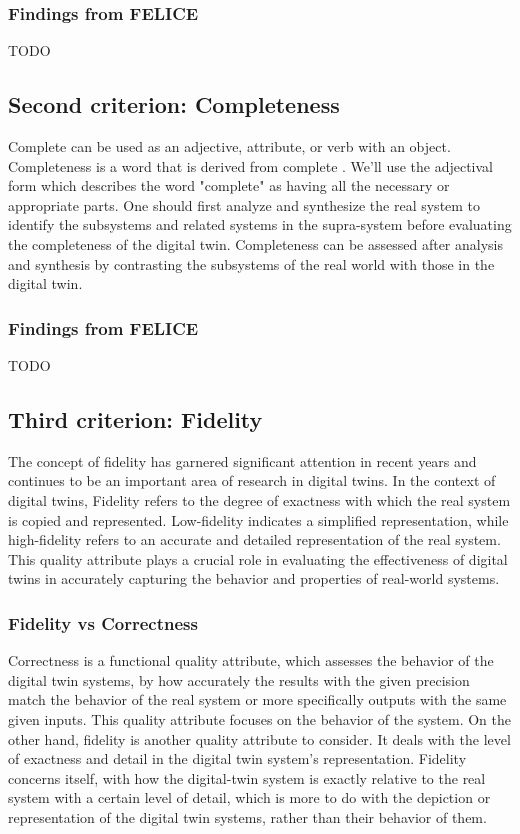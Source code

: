 \documentclass[9pt,conference]{IEEEtran}
\begin{document}
    \subsubsection{Findings from FELICE}
    TODO

    \subsection{Second criterion: Completeness}
    Complete can be used as an adjective, attribute, or verb with an object. Completeness is a word that is derived from complete \cite{OxfordDictionary}.
    We'll use the adjectival form which describes the word "complete" as having all the necessary or appropriate parts.
    One should first analyze and synthesize the real system to identify the subsystems and related systems in the supra-system before evaluating the completeness of the digital twin. 
    Completeness can be assessed after analysis and synthesis by contrasting the subsystems of the real world with those in the digital twin.

    \subsubsection{Findings from FELICE}
    TODO

    \subsection{Third criterion: Fidelity}
    The concept of fidelity has garnered significant attention in recent years and continues to be an important area of research in digital twins.
    In the context of digital twins, Fidelity refers to the degree of exactness with which the real system is copied and represented.
    Low-fidelity indicates a simplified representation, while high-fidelity refers to an accurate and detailed representation of the real system.
    This quality attribute plays a crucial role in evaluating the effectiveness of digital twins in accurately capturing the behavior and properties of real-world systems. 
    \subsubsection*{Fidelity vs Correctness}
    Correctness is a functional quality attribute, which assesses the behavior of the digital twin systems, by how accurately the results with the given precision match the behavior of the real system or more
    specifically outputs with the same given inputs. 
    This quality attribute focuses on the behavior of the system.
    On the other hand, fidelity is another quality attribute to consider. 
    It deals with the level of exactness and detail in the digital twin system's representation. 
    Fidelity concerns itself, with how the digital-twin system is exactly relative to the real system with a certain level of detail, which is more to do with the depiction or representation of the digital twin systems, rather than their behavior of them.
\end{document}

